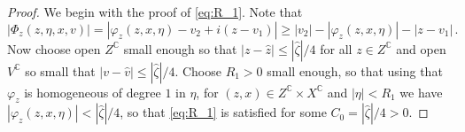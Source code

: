 \documentclass[
	fontsize=11pt, 
	twoside=false, 
	abstract=true, 
	a4paper,
]{scrartcl}
\newcommand{\CC}{\mathbb{C}}
\newcommand{\abs}[1]{\left\lvert#1\right\rvert}
\newcommand{\del}{\partial}
\begin{document}
\begin{proof}
%	
%
%
	
	We begin with the proof of \cref{eq:R_1}. Note that
	\[
		\abs{\Phi_z(z,\eta,x,v)} = \abs{\varphi_z(z,x,\eta)-v_2+i(z-v_1)} \geq \abs{v_2}- \abs{\varphi_z(z,x,\eta)} - \abs{z-v_1}\,.
	\]
	Now choose open $Z^\CC$ small enough so that $\abs{z-\hat z} \leq \abs{\hat\zeta}/4$ for all $z\in Z^\CC$ and open $V^\CC$ so small that $\abs{v-\hat v} \leq \abs{\hat\zeta}/4$. Choose $R_1 > 0$ small enough, so that using that $\varphi_z$ is homogeneous of degree $1$ in $\eta$, for $(z,x)\in Z^\CC\times X^\CC$ and $\abs{\eta}<R_1$ we have $\abs{\varphi_z(z,x,\eta)} < \abs{\hat\zeta}/4$, so that \cref{eq:R_1} is satisfied for some $C_0 = \abs{\hat\zeta}/4 >0$.


\end{proof}
\end{document}
